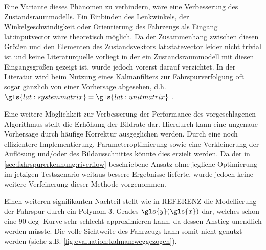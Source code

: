 Eine Variante dieses Phänomen zu verhindern, wäre eine Verbesserung des Zustandsraummodells. 
Ein Einbinden des Lenkwinkels, der Winkelgeschwindigkeit oder Orientierung des Fahrzeugs als Eingang \gls{lat:inputvector} wäre theoretisch möglich. Da der Zusammenhang zwischen diesen Größen und den Elementen des Zustandsvektors \gls{lat:statevector} leider nicht trivial ist und keine Literaturquelle vorliegt in der ein Zustandsraummodell mit diesen Eingangsgrößen gezeigt ist, wurde jedoch vorerst darauf verzichtet. In der Literatur wird beim Nutzung eines Kalmanfilters zur Fahrspurverfolgung oft sogar gänzlich von einer Vorhersage abgesehen, d.h. \(\gls{lat:systemmatrix}=\gls{lat:unitmatrix}\) \autocite{limRiverFlowLane2012}.

Eine weitere Möglichkeit zur Verbesserung der Performance des vorgeschlagenen Algorithmus stellt die Erhöhung der Bildrate dar. Hierdurch kann eine ungenaue Vorhersage durch häufige Korrektur ausgeglichen werden. Durch eine noch effizientere Implementierung, Parameteroptimierung sowie eine Verkleinerung der Auflösung und/oder des Bildausschnittes könnte dies erzielt werden. Da der in \ref{sec:fahrspurerkennung:riverflow} beschriebene Ansatz ohne jegliche Optimierung im jetzigen Testszenario weitaus bessere Ergebnisse lieferte, wurde jedoch keine weitere Verfeinerung dieser Methode vorgenommen.

Einen weiteren signifikanten Nachteil stellt wie in REFERENZ die Modellierung der Fahrspur durch ein Polynom 3. Grades \(\gls{y}(\gls{x})\) dar, welches schon eine \(90\deg\)-Kurve sehr schlecht approximieren kann, da dessen Anstieg unendlich werden müsste. Die volle Sichtweite des Fahrzeugs kann somit nicht genutzt werden (siehe z.B. \ref{fig:evaluation:kalman:weggezogen}).
